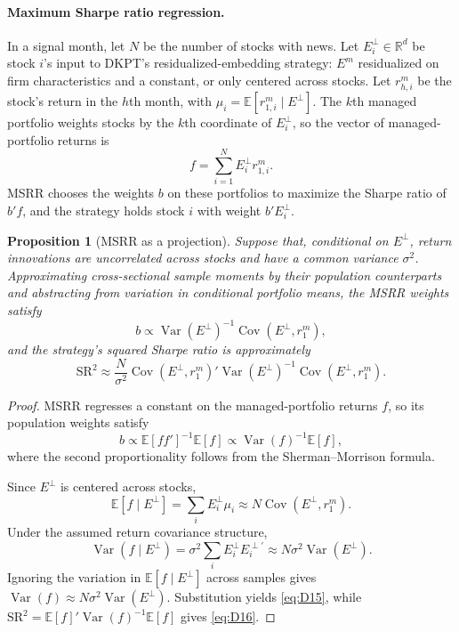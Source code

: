 \documentclass[11pt,letterpaper]{article}
\newtheorem{proposition}{Proposition}
\theoremstyle{remark}
\DeclareMathOperator{\Var}{Var}
\DeclareMathOperator{\Cov}{Cov}
\begin{document}
\paragraph{Maximum Sharpe ratio regression.}
In a signal month, let $N$ be the number of stocks with news. Let $E^\perp_i\in\mathbb R^d$ be stock $i$'s input to DKPT's residualized-embedding strategy: $E^m$ residualized on firm characteristics and a constant, or only centered across stocks. Let $r^m_{h,i}$ be the stock's return in the $h$th month, with $\mu_i=\mathbb E[r^m_{1,i}\mid E^\perp]$. The $k$th managed portfolio weights stocks by the $k$th coordinate of $E^\perp_i$, so the vector of managed-portfolio returns is
\[
f=\sum_{i=1}^{N}E^\perp_i r^m_{1,i}.
\]
MSRR chooses the weights $b$ on these portfolios to maximize the Sharpe ratio of $b'f$, and the strategy holds stock $i$ with weight $b'E^\perp_i$.

\begin{proposition}[MSRR as a projection]\label{prop:D2}
Suppose that, conditional on $E^\perp$, return innovations are uncorrelated across stocks and have a common variance $\sigma^2$. Approximating cross-sectional sample moments by their population counterparts and abstracting from variation in conditional portfolio means, the MSRR weights satisfy
\begin{equation}\label{eq:D15}
b\propto\Var(E^\perp)^{-1}\Cov(E^\perp,r^m_1),
\end{equation}
and the strategy's squared Sharpe ratio is approximately
\begin{equation}\label{eq:D16}
\mathrm{SR}^2\approx
\frac{N}{\sigma^2}
\Cov(E^\perp,r^m_1)'
\Var(E^\perp)^{-1}
\Cov(E^\perp,r^m_1).
\end{equation}
\end{proposition}

\begin{proof}
MSRR regresses a constant on the managed-portfolio returns $f$, so its population weights satisfy
\[
b\propto\mathbb E[ff']^{-1}\mathbb E[f]
\propto\Var(f)^{-1}\mathbb E[f],
\]
where the second proportionality follows from the Sherman--Morrison formula.

Since $E^\perp$ is centered across stocks,
\[
\mathbb E[f\mid E^\perp]
=\sum_i E^\perp_i\mu_i
\approx N\Cov(E^\perp,r^m_1).
\]
Under the assumed return covariance structure,
\[
\Var(f\mid E^\perp)
=\sigma^2\sum_i E^\perp_i E_i^{\perp\prime}
\approx N\sigma^2\Var(E^\perp).
\]
Ignoring the variation in $\mathbb E[f\mid E^\perp]$ across samples gives
$\Var(f)\approx N\sigma^2\Var(E^\perp)$.
Substitution yields \eqref{eq:D15}, while
$\mathrm{SR}^2=\mathbb E[f]'\Var(f)^{-1}\mathbb E[f]$
gives \eqref{eq:D16}.
\end{proof}
\end{document}
